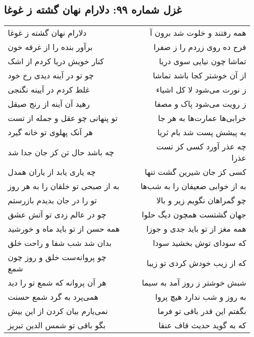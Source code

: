 \begin{center}
\section*{غزل شماره ۹۹: دلارام نهان گشته ز غوغا}
\label{sec:0099}
\begin{longtable}{l p{0.5cm} r}
دلارام نهان گشته ز غوغا
&&
همه رفتند و خلوت شد برون آ
\\
برآور بنده را از غرقه خون
&&
فرح ده روی زردم را ز صفرا
\\
کنار خویش دریا کردم از اشک
&&
تماشا چون نیایی سوی دریا
\\
چو تو در آینه دیدی رخ خود
&&
از آن خوشتر کجا باشد تماشا
\\
غلط کردم در آیینه نگنجی
&&
ز نورت می‌شود لا کل اشیاء
\\
رهید آن آینه از رنج صیقل
&&
ز رویت می‌شود پاک و مصفا
\\
تو پنهانی چو عقل و جمله از تست
&&
خرابی‌ها عمارت‌ها به هر جا
\\
هر آنک پهلوی تو خانه گیرد
&&
به پیشش پست شد بام ثریا
\\
چه باشد حال تن کز جان جدا شد
&&
چه عذر آورد کسی کز تست عذرا
\\
چه یاری یابد از یاران همدل
&&
کسی کز جان شیرین گشت تنها
\\
به از صبحی تو خلقان را به هر روز
&&
به از خوابی ضعیفان را به شب‌ها
\\
تو را در جان بدیدم بازرستم
&&
چو گمراهان نگویم زیر و بالا
\\
چو در عالم زدی تو آتش عشق
&&
جهان گشتست همچون دیگ حلوا
\\
همه حسن از تو باید ماه و خورشید
&&
همه مغز از تو باید جدی و جوزا
\\
بدان شد شب شفا و راحت خلق
&&
که سودای توش بخشید سودا
\\
چو پروانه‌ست خلق و روز چون شمع
&&
که از زیب خودش کردی تو زیبا
\\
هر آن پروانه که شمع تو را دید
&&
شبش خوشتر ز روز آمد به سیما
\\
همی‌پرد به گرد شمع حسنت
&&
به روز و شب ندارد هیچ پروا
\\
نمی‌یارم بیان کردن از این بیش
&&
بگفتم این قدر باقی تو فرما
\\
بگو باقی تو شمس الدین تبریز
&&
که به گوید حدیث قاف عنقا
\\
\end{longtable}
\end{center}
